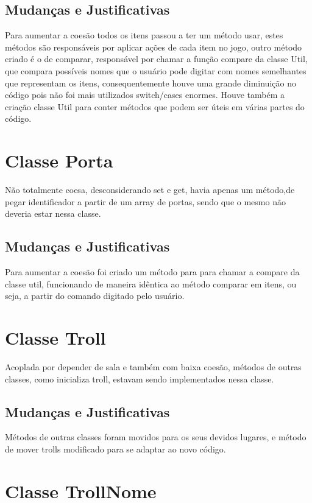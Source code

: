\documentclass[runningheads,a4paper]{llncs}
\begin{document}
\subsection{Mudanças e Justificativas}

Para aumentar a coesão todos os itens passou a ter um método usar, estes métodos são responsáveis por aplicar ações de cada item no jogo, outro método criado é o de comparar, responsável por chamar a função compare da classe Util, que compara possíveis nomes que o usuário pode digitar com nomes semelhantes que representam os itens, consequentemente houve uma grande diminuição no código pois não foi mais utilizados switch/cases enormes. Houve também a criação classe Util para conter métodos que podem ser úteis em várias partes do código.

\section{Classe Porta}

Não totalmente coesa, desconsiderando set e get, havia apenas um método,de pegar identificador a partir de um array de portas, sendo que o mesmo não deveria estar nessa classe.

\subsection{Mudanças e Justificativas}

Para aumentar a coesão foi criado um método para para chamar a compare da classe util, funcionando de maneira idêntica ao método comparar em itens, ou seja, a partir do comando digitado pelo usuário. 

\section{Classe Troll}

Acoplada por depender de sala e também com baixa coesão, métodos de outras classes, como inicializa troll, estavam sendo implementados nessa classe.

\subsection{Mudanças e Justificativas}

Métodos de outras classes foram movidos para os seus devidos lugares, e método de mover trolls modificado para se adaptar ao novo código.

\section{Classe TrollNome}
\end{document}
